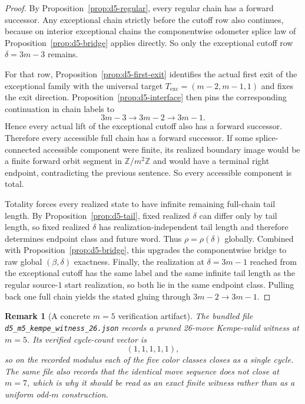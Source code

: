 \documentclass[11pt]{article}
\newtheorem{remark}{Remark}
\begin{document}
\begin{proof}
By Proposition~\ref{prop:d5-regular}, every regular chain has a forward successor.
Any exceptional chain strictly before the cutoff row also continues, because on interior exceptional chains the componentwise odometer splice law of Proposition~\ref{prop:d5-bridge} applies directly.
So only the exceptional cutoff row $\delta=3m-3$ remains.

For that row, Proposition~\ref{prop:d5-first-exit} identifies the actual first exit of the exceptional family with the universal target $T_{\mathrm{exc}}=(m-2,m-1,1)$ and fixes the exit direction.
Proposition~\ref{prop:d5-interface} then pins the corresponding continuation in chain labels to
\[
3m-3 \to 3m-2 \to 3m-1.
\]
Hence every actual lift of the exceptional cutoff also has a forward successor.
Therefore every accessible full chain has a forward successor.
If some splice-connected accessible component were finite, its realized boundary image would be a finite forward orbit segment in $\mathbb Z/m^2\mathbb Z$ and would have a terminal right endpoint, contradicting the previous sentence.
So every accessible component is total.

Totality forces every realized state to have infinite remaining full-chain tail length.
By Proposition~\ref{prop:d5-tail}, fixed realized $\delta$ can differ only by tail length, so fixed realized $\delta$ has realization-independent tail length and therefore determines endpoint class and future word.
Thus $\rho=\rho(\delta)$ globally.
Combined with Proposition~\ref{prop:d5-bridge}, this upgrades the componentwise bridge to raw global $(\beta,\delta)$ exactness.
Finally, the realization at $\delta=3m-1$ reached from the exceptional cutoff has the same label and the same infinite tail length as the regular source-$1$ start realization, so both lie in the same endpoint class.
Pulling back one full chain yields the stated gluing through $3m-2\to 3m-1$.
\end{proof}


\begin{remark}[A concrete $m=5$ verification artifact]
The bundled file \nolinkurl{d5_m5_kempe_witness_26.json} records a pruned 26-move Kempe-valid witness at $m=5$.
Its verified cycle-count vector is
\[
(1,1,1,1,1),
\]
so on the recorded modulus each of the five color classes closes as a single cycle.
The same file also records that the identical move sequence does not close at $m=7$, which is why it should be read as an exact finite witness rather than as a uniform odd-$m$ construction.
\end{remark}
\end{document}
